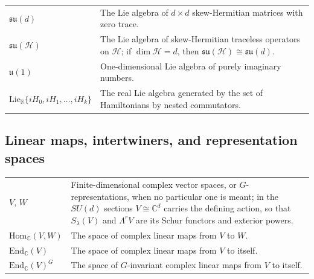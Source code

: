 \documentclass[10pt,twocolumn,superscriptaddress,aps,amsmath,amssymb,citeautoscript,floatfix,prx]{revtex4-2}
\newcounter{alg}
\theoremstyle{plain}
\theoremstyle{plain}
\theoremstyle{plain}
\theoremstyle{plain}
\theoremstyle{plain}
\theoremstyle{plain}
\newcommand{\C}{\mathbb{C}}
\newcommand{\R}{\mathbb{R}}
\newcommand{\End}{\mathrm{End}}
\newcommand{\Hom}{\mathrm{Hom}}
\newcommand{\Lie}{\mathrm{Lie}}
\theoremstyle{plain}
\theoremstyle{definition}
\theoremstyle{plain}
\begin{document}
\begin{appendix}
\begin{tabular}{@{}ll@{}}
\parbox[t]{0.22\textwidth}{$\mathfrak{su}(d)$} & \parbox[t]{0.72\textwidth}{The Lie algebra of $d \times d$ skew-Hermitian matrices with zero trace.} \\[0.6em]

\parbox[t]{0.22\textwidth}{$\mathfrak{su}(\mathcal{H})$} & \parbox[t]{0.72\textwidth}{The Lie algebra of skew-Hermitian traceless operators on \(\mathcal H\); if \(\dim\mathcal H=d\), then \(\mathfrak{su}(\mathcal H)\cong\mathfrak{su}(d)\).} \\[0.6em]

\parbox[t]{0.22\textwidth}{$\mathfrak{u}(1)$} & \parbox[t]{0.72\textwidth}{One-dimensional Lie algebra of purely imaginary numbers.} \\[0.6em]

\parbox[t]{0.22\textwidth}{$\Lie_{\R}\{i H_0, i H_1, \ldots, i H_k\}$} & \parbox[t]{0.72\textwidth}{The real Lie algebra generated by the set of Hamiltonians by nested commutators.} \\[0.6em]

\end{tabular}


\subsection*{Linear maps, intertwiners, and representation spaces}

\begin{tabular}{@{}ll@{}}

\parbox[t]{0.22\textwidth}{$V$, $W$} & \parbox[t]{0.72\textwidth}{Finite-dimensional complex vector spaces, or $G$-representations, when no particular one is meant; in the $SU(d)$ sections $V\cong\mathbb C^d$ carries the defining action, so that $S_\lambda(V)$ and $\Lambda^rV$ are its Schur functors and exterior powers.} \\[0.6em]

\parbox[t]{0.22\textwidth}{$\Hom_{\C}(V, W)$} & \parbox[t]{0.72\textwidth}{The space of complex linear maps from $V$ to $W$.} \\[0.6em]

\parbox[t]{0.22\textwidth}{$\End_{\C}(V)$} & \parbox[t]{0.72\textwidth}{The space of complex linear maps from $V$ to itself.} \\[0.6em]

\parbox[t]{0.22\textwidth}{$\End_{\C}(V)^G$} & \parbox[t]{0.72\textwidth}{The space of $G$-invariant complex linear maps from $V$ to itself.} \\[0.6em]


\end{tabular}
\end{appendix}
\end{document}
